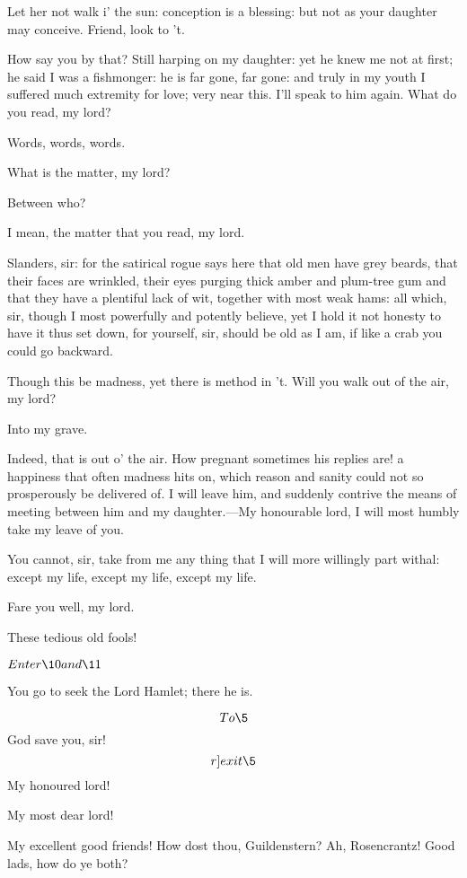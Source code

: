 \documentclass[11pt]{book}
\begin{document}
\1	Let her not walk i' the sun: conception is a
	blessing: but not as your daughter may conceive.
	Friend, look to 't.

\aparte\5  How say you by that? Still harping on my
	daughter: yet he knew me not at first; he said I
	was a fishmonger: he is far gone, far gone: and
	truly in my youth I suffered much extremity for
	love; very near this. I'll speak to him again.
	What do you read, my lord?

\1	Words, words, words.

\5	What is the matter, my lord?

\1	Between who?

\5	I mean, the matter that you read, my lord.

\1	Slanders, sir: for the satirical rogue says here
	that old men have grey beards, that their faces are
	wrinkled, their eyes purging thick amber and
	plum-tree gum and that they have a plentiful lack of
	wit, together with most weak hams: all which, sir,
	though I most powerfully and potently believe, yet
	I hold it not honesty to have it thus set down, for
	yourself, sir, should be old as I am, if like a crab
	you could go backward.

\aparte\5  Though this be madness, yet there is method
	in 't. Will you walk out of the air, my lord?

\1	Into my grave.

\aparte\5	Indeed, that is out o' the air.
	How pregnant sometimes his replies are! a happiness
	that often madness hits on, which reason and sanity
	could not so prosperously be delivered of. I will
	leave him, and suddenly contrive the means of
	meeting between him and my daughter.---My honourable
	lord, I will most humbly take my leave of you.

\1	You cannot, sir, take from me any thing that I will
	more willingly part withal: except my life, except
	my life, except my life.

\5	Fare you well, my lord.

\1	These tedious old fools!

	\(Enter \10 and \11\)

\5	You go to seek the Lord Hamlet; there he is.

 \[To \5\]  God save you, sir! \[r]exit \5\]
	My honoured lord!

	My most dear lord!

\1	My excellent good friends! How dost thou,
	Guildenstern? Ah, Rosencrantz! Good lads, how do ye both?
\end{document}
